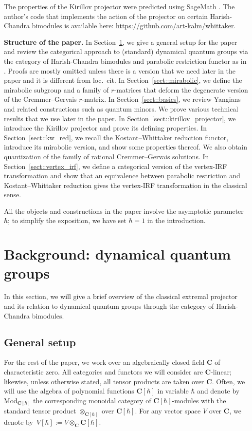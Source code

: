 \documentclass[10pt,a4paper]{amsart}
\numberwithin{equation}{section}
\newcommand{\C}{\mathbf{C}}
\newcommand{\Mod}[1]{{\mathrm{Mod}}_{#1}}
\begin{document}
	The properties of the Kirillov projector were predicted using SageMath \cite{SageMath}. The author's code that implements the action of the projector on certain Harish-Chandra bimodules is available here: \url{https://github.com/art-kalm/whittaker}.
	
	
{\bf Structure of the paper.} In Section~\ref{sect::dynamical_quantum_groups}, we give a general setup for the paper and review the categorical approach to (standard) dynamical quantum groups via the category of Harish-Chandra bimodules and parabolic restriction functor as in \cite{KalmykovSafronov}. Proofs are mostly omitted unless there is a version that we need later in the paper and it is different from loc.\ cit. In Section~\ref{sect::mirabolic}, we define the mirabolic subgroup and a family of $r$-matrices that deform the degenerate version of the Cremmer--Gervais $r$-matrix. In Section~\ref{sect::basics}, we review Yangians and related constructions such as quantum minors. We prove various technical results that we use later in the paper. In Section~\ref{sect::kirillov_projector}, we introduce the Kirillov projector and prove its defining properties. In Section~\ref{sect::kw_red}, we recall the Kostant--Whittaker reduction functor, introduce its mirabolic version, and show some properties thereof. We also obtain quantization of the family of rational Cremmer--Gervais solutions. In Section~\ref{sect::vertex_irf}, we define a categorical version of the vertex-IRF transformation and show that an equivalence between parabolic restriction and Kostant--Whittaker reduction gives the vertex-IRF transformation in the classical sense.
	
	All the objects and constructions in the paper involve the asymptotic parameter $\hbar$; to simplify the exposition, we have set $\hbar=1$ in the introduction.
	
	
	
	\section{Background: dynamical quantum groups}
	\label{sect::dynamical_quantum_groups}
	
	\renewcommand{\theequation}{\arabic{section}.\arabic{equation}}
	
	In this section, we will give a brief overview of the classical extremal projector and its relation to dynamical quantum groups through the category of Harish-Chandra bimodules.
	
	\subsection{General setup}
	\label{subsect::general_setup}
	For the rest of the paper, we work over an algebraically closed field $\C$ of characteristic zero. All categories and functors we will consider are $\C$-linear; likewise, unless otherwise stated, all tensor products are taken over $\C$. Often, we will use the algebra of polynomial functions $\C[\hbar]$ in variable $\hbar$ and denote by $\Mod{\C[\hbar]}$ the corresponding monoidal category of $\C[\hbar]$-modules with the standard tensor product $\otimes_{\C[\hbar]}$ over $\C[\hbar]$. For any vector space $V$ over $\C$, we denote by~${V[\hbar]:= V \otimes_{\C} \C[\hbar]}$.
	
\end{document}
